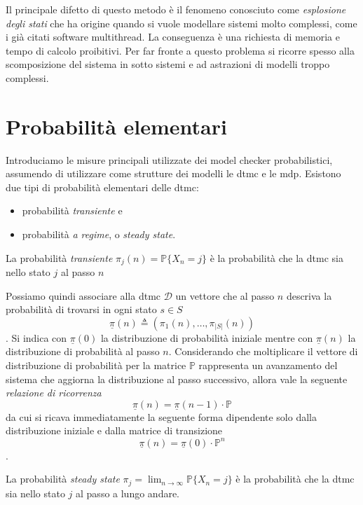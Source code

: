 Il principale difetto di questo metodo è il fenomeno conosciuto come \emph{esplosione degli stati} che ha origine quando si vuole modellare sistemi molto complessi, come i già citati software multithread. La conseguenza è una richiesta di memoria e tempo di calcolo proibitivi. Per far fronte a questo problema si ricorre spesso alla scomposizione del sistema in sotto sistemi e ad astrazioni di modelli troppo complessi.

\section{Probabilit\`a elementari}
Introduciamo le misure principali utilizzate dei model checker probabilistici, assumendo di utilizzare come strutture dei modelli le \ac{dtmc} e le \ac{mdp}. Esistono due tipi di probabilità elementari delle \ac{dtmc}:
\begin{itemize}
	\item probabilità \emph{transiente} e
	\item probabilità \emph{a regime}, o \emph{steady state}.
\end{itemize}

\begin{mtdef}
La probabilità \emph{transiente} $\pi_j(n) = \mathbb{P}\{X_n = j\}$ è la probabilità che la \ac{dtmc} sia nello stato $j$ al passo $n$
\end{mtdef}

Possiamo quindi associare alla \ac{dtmc} $\mathcal{D}$ un vettore che al passo $n$ descriva la probabilità di trovarsi in ogni stato $s \in S$ $$\underline\pi(n) \triangleq (\pi_1(n), \dots, \pi_{|S|}(n))$$.
Si indica con $\underline\pi(0)$ la distribuzione di probabilità iniziale mentre con $\underline\pi(n)$ la distribuzione di probabilità al passo $n$.
Considerando che moltiplicare il vettore di distribuzione di probabilità per la matrice $\mathbb{P}$ rappresenta un avanzamento del sistema che aggiorna la distribuzione al passo successivo, allora vale la seguente \emph{relazione di ricorrenza}
$$ \underline\pi(n) = \underline\pi(n-1) \cdot \mathbb{P} $$
da cui si ricava immediatamente la seguente forma dipendente solo dalla  distribuzione iniziale e dalla matrice di transizione
$$ \underline\pi(n) = \underline\pi(0) \cdot \mathbb{P}^n$$.

\begin{mtdef}
La probabilità \emph{steady state} $\pi_j = \lim_{n\rightarrow\infty} \mathbb{P}\{X_n = j\}$ è la probabilità che la \ac{dtmc} sia nello stato $j$ al passo a lungo andare.
\end{mtdef}

